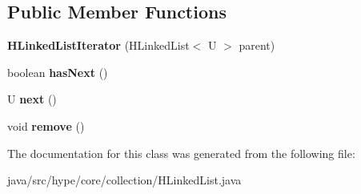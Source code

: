 \subsection*{Public Member Functions}
\begin{DoxyCompactItemize}
\item 
\hypertarget{classhype_1_1core_1_1collection_1_1_h_linked_list_3_01_t_01_4_1_1_h_linked_list_iterator_3_01_u_01_4_a4d04d996af802ddd01ebc8d00a3d3f66}{{\bfseries H\-Linked\-List\-Iterator} (H\-Linked\-List$<$ U $>$ parent)}\label{classhype_1_1core_1_1collection_1_1_h_linked_list_3_01_t_01_4_1_1_h_linked_list_iterator_3_01_u_01_4_a4d04d996af802ddd01ebc8d00a3d3f66}

\item 
\hypertarget{classhype_1_1core_1_1collection_1_1_h_linked_list_3_01_t_01_4_1_1_h_linked_list_iterator_3_01_u_01_4_af2fd1d59bacd8d608dbbccf6f6bae9d2}{boolean {\bfseries has\-Next} ()}\label{classhype_1_1core_1_1collection_1_1_h_linked_list_3_01_t_01_4_1_1_h_linked_list_iterator_3_01_u_01_4_af2fd1d59bacd8d608dbbccf6f6bae9d2}

\item 
\hypertarget{classhype_1_1core_1_1collection_1_1_h_linked_list_3_01_t_01_4_1_1_h_linked_list_iterator_3_01_u_01_4_ab1b2aff00872b6cf8a12d80a8e3d6364}{U {\bfseries next} ()}\label{classhype_1_1core_1_1collection_1_1_h_linked_list_3_01_t_01_4_1_1_h_linked_list_iterator_3_01_u_01_4_ab1b2aff00872b6cf8a12d80a8e3d6364}

\item 
\hypertarget{classhype_1_1core_1_1collection_1_1_h_linked_list_3_01_t_01_4_1_1_h_linked_list_iterator_3_01_u_01_4_abbb5fa9878567493e444680a82d86435}{void {\bfseries remove} ()}\label{classhype_1_1core_1_1collection_1_1_h_linked_list_3_01_t_01_4_1_1_h_linked_list_iterator_3_01_u_01_4_abbb5fa9878567493e444680a82d86435}

\end{DoxyCompactItemize}


The documentation for this class was generated from the following file\-:\begin{DoxyCompactItemize}
\item 
java/src/hype/core/collection/H\-Linked\-List.\-java\end{DoxyCompactItemize}
